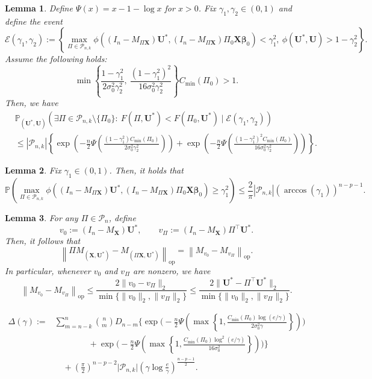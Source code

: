 \documentclass[10pt,a4paper]{amsart}
\newtheorem{lemma}{Lemma}
\newcommand{\bP}{\mathbb{P}}
\renewcommand{\ge}{\geqslant}
\renewcommand{\le}{\leqslant}
\newcommand{\mP}{\mathcal{P}}
\begin{document}
\begin{lemma}\label{lem:F-union}
Define $\Psi(x)=x-1-\log x$ for $x>0$. Fix $\gamma_1,\gamma_2\in(0,1)$ and define the event
\[
\mathcal E(\gamma_1,\gamma_2)
:=
\left\{
\max_{\Pi\in\mP_{n,k}}
\phi\left((I_n-M_{\Pi\bm X})\bm U^*, (I_n-M_{\Pi\bm X})\Pi_0\bm X\bm\beta_0\right)
<\gamma_1^2,\ 
\phi(\bm U^*,\bm U)>1-\gamma_2^2
\right\}.
\]
Assume the following holds:
\[
\min\left\{
\frac{1-\gamma_1^2}{2\sigma_0^2\gamma_2^2},\
\frac{(1-\gamma_1^2)^2}{16\sigma_0^2\gamma_2^2}
\right\}C_{\min}(\Pi_0)>1.
\]
Then, we have
\begin{align*}
&\bP_{(\bm U^*,\bm U)}\left(
\exists\Pi\in\mP_{n,k}\setminus\{\Pi_0\}:\ 
F(\Pi,\bm U^*)<F(\Pi_0,\bm U^*)
\mid 
\mathcal E(\gamma_1,\gamma_2)
\right)\\
&\le
|\mP_{n,k}|\left\{
\exp\left( -\frac{n}{2}\Psi\left( \frac{(1-\gamma_1^2)C_{\min}(\Pi_0)}{2\sigma_0^2\gamma_2^2}\right)\right)
+\exp\left( -\frac{n}{2}\Psi\left( \frac{(1-\gamma_1^2)^2C_{\min}(\Pi_0)}{16\sigma_0^2\gamma_2^2}\right)\right)
\right\}.
\end{align*}
\end{lemma}

\begin{lemma}\label{lem:max-sim}
Fix $\gamma_1\in(0,1)$. Then, it holds that
\[
\bP\left(
\max_{\Pi\in\mP_{n,k}}
\phi\left((I_n-M_{\Pi\bm X})\bm U^*, (I_n-M_{\Pi\bm X})\Pi_0\bm X\bm\beta_0\right)
\ge \gamma_1^2
\right)
\le
\frac{2}{\pi}|\mP_{n,k}|\left(\arccos(\gamma_1)\right)^{n-p-1}.
\]
\end{lemma}

\begin{lemma}\label{lem:proj-diff}
For any $\Pi\in\mP_n$, define
\[
v_0:=(I_n-M_{\bm X})\bm U^*,
\qquad
v_\Pi:=(I_n-M_{\bm X})\Pi^\top \bm U^* .
\]
Then, it follows that
\begin{equation}
\left\|\Pi M_{(\bm X,\bm U^*)} - M_{(\Pi \bm X,\bm U^*)}\right\|_{\mathrm{op}}
=
\left\|M_{v_0}-M_{v_\Pi}\right\|_{\mathrm{op}} .
\label{eq:PiPminusM}
\end{equation}
In particular, whenever $v_0$ and $v_\Pi$ are nonzero, we have
\begin{equation}
\left\|M_{v_0}-M_{v_\Pi}\right\|_{\mathrm{op}}
\le
\frac{2\|v_0-v_\Pi\|_2}{\min\{\|v_0\|_2,\|v_\Pi\|_2\}}
\le
\frac{2\|\bm U^*-\Pi^\top \bm U^*\|_2}{\min\{\|v_0\|_2,\|v_\Pi\|_2\}} .
\label{eq:rank1-diff}
\end{equation}
\end{lemma}

\begin{align}
\label{eq:Delta-gamma}
\Delta(\gamma)
:=
&\sum_{m=n-k}^n\binom{n}{m}D_{n-m}
\Bigg\{
\exp\Bigg(
-\frac{n}{2}\Psi\left(
\max\left\{1,
\frac{C_{\min}(\Pi_0)\log(e/\gamma)}{2\sigma_0^2\gamma}
\right\}
\right)
\Bigg)
\nonumber\\
&\qquad\qquad+
\exp\Bigg(
-\frac{n}{2}\Psi\left(
\max\left\{1,
\frac{C_{\min}(\Pi_0)\log^2(e/\gamma)}{16\sigma_0^2}
\right\}
\right)
\Bigg)
\Bigg\}
\nonumber\\
&\quad+
\left(\frac{\pi}{2}\right)^{n-p-2}\lvert\mP_{n,k}\rvert
\left(\gamma\log\frac{e}{\gamma}\right)^{\frac{n-p-1}{2}}.
\end{align}
\end{document}
